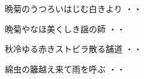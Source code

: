 \vspace{0.6cm}
\begin{shiika}晩菊のうつろいはじむ白きより
\hfill{・・}\end{shiika}
\vspace{0.6cm}
\begin{shiika}晩菊やなほ美くしき謡の師
\hfill{・・}\end{shiika}
\vspace{0.6cm}
\begin{shiika}秋冷ゆる赤きストビラ散る舗道
\hfill{・・}\end{shiika}
\vspace{0.6cm}
\begin{shiika}綿虫の籬越え来て雨を呼ぶ
\hfill{・・}\end{shiika}
